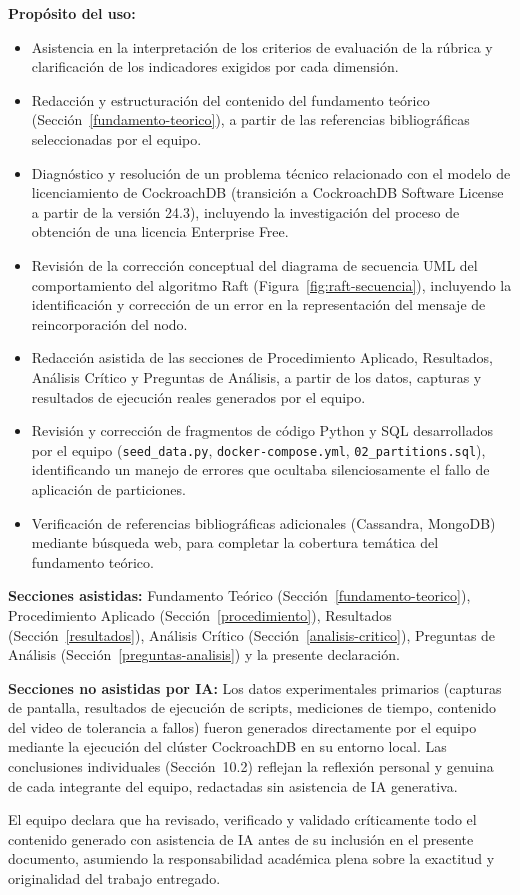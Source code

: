 \documentclass[12pt, a4paper]{article}
\begin{document}
\textbf{Propósito del uso:}
\begin{itemize}
    \item Asistencia en la interpretación de los criterios de evaluación de la rúbrica y clarificación de los indicadores exigidos por cada dimensión.
    \item Redacción y estructuración del contenido del fundamento teórico (Sección~\ref{fundamento-teorico}), a partir de las referencias bibliográficas seleccionadas por el equipo.
    \item Diagnóstico y resolución de un problema técnico relacionado con el modelo de licenciamiento de CockroachDB (transición a CockroachDB Software License a partir de la versión 24.3), incluyendo la investigación del proceso de obtención de una licencia Enterprise Free.
    \item Revisión de la corrección conceptual del diagrama de secuencia UML del comportamiento del algoritmo Raft (Figura~\ref{fig:raft-secuencia}), incluyendo la identificación y corrección de un error en la representación del mensaje de reincorporación del nodo.
    \item Redacción asistida de las secciones de Procedimiento Aplicado, Resultados, Análisis Crítico y Preguntas de Análisis, a partir de los datos, capturas y resultados de ejecución reales generados por el equipo.
    \item Revisión y corrección de fragmentos de código Python y SQL desarrollados por el equipo (\texttt{seed\_data.py}, \texttt{docker-compose.yml}, \texttt{02\_partitions.sql}), identificando un manejo de errores que ocultaba silenciosamente el fallo de aplicación de particiones.
    \item Verificación de referencias bibliográficas adicionales (Cassandra, MongoDB) mediante búsqueda web, para completar la cobertura temática del fundamento teórico.
\end{itemize}

\textbf{Secciones asistidas:} Fundamento Teórico (Sección~\ref{fundamento-teorico}), Procedimiento Aplicado (Sección~\ref{procedimiento}), Resultados (Sección~\ref{resultados}), Análisis Crítico (Sección~\ref{analisis-critico}), Preguntas de Análisis (Sección~\ref{preguntas-analisis}) y la presente declaración.

\textbf{Secciones no asistidas por IA:} Los datos experimentales primarios (capturas de pantalla, resultados de ejecución de scripts, mediciones de tiempo, contenido del video de tolerancia a fallos) fueron generados directamente por el equipo mediante la ejecución del clúster CockroachDB en su entorno local. Las conclusiones individuales (Sección~10.2) reflejan la reflexión personal y genuina de cada integrante del equipo, redactadas sin asistencia de IA generativa.

El equipo declara que ha revisado, verificado y validado críticamente todo el contenido generado con asistencia de IA antes de su inclusión en el presente documento, asumiendo la responsabilidad académica plena sobre la exactitud y originalidad del trabajo entregado.

\newpage
\printbibliography[title={Bibliografía}]
\end{document}
